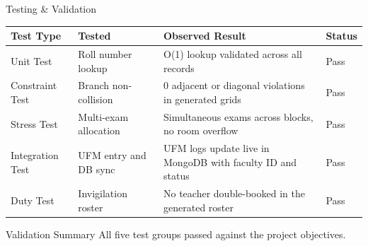 \documentclass[aspectratio=169,11pt]{beamer}
\begin{document}
\begin{frame}{Testing \& Validation}

\scriptsize

\begin{center}

\renewcommand{\arraystretch}{1.25}

\begin{tabularx}{.96\textwidth}
{@{}p{2.2cm}p{2.5cm}X p{0.9cm}@{}}

\toprule
Test Type &
Tested &
Observed Result &
Status\\
\midrule

Unit Test &
Roll number lookup &
O(1) lookup validated across all records &
Pass\\

Constraint Test &
Branch non-collision &
0 adjacent or diagonal violations in generated grids &
Pass\\

Stress Test &
Multi-exam allocation &
Simultaneous exams across blocks, no room overflow &
Pass\\

Integration Test &
UFM entry and DB sync &
UFM logs update live in MongoDB with faculty ID and status &
Pass\\

Duty Test &
Invigilation roster &
No teacher double-booked in the generated roster &
Pass\\

\bottomrule

\end{tabularx}

\end{center}

\vspace{2mm}

\begin{block}{Validation Summary}
\small
All five test groups passed against the project objectives.
\end{block}

\end{frame}
\end{document}

